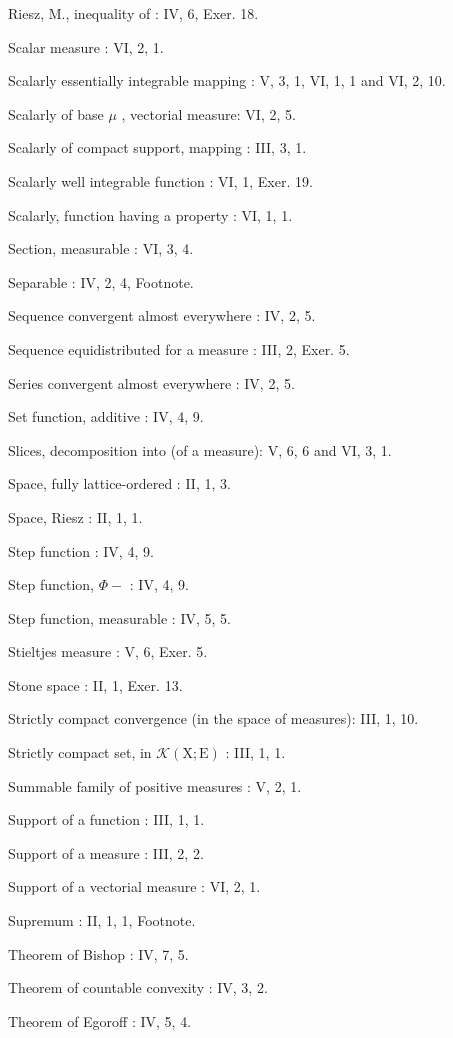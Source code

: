Riesz, M., inequality of : IV, 6, Exer. 18.

Scalar measure : VI, 2, 1.

Scalarly essentially integrable mapping : V, 3, 1, VI, 1, 1 and VI, 2, 10.

Scalarly of base \(\mu\) , vectorial measure: VI, 2, 5.

Scalarly of compact support, mapping : III, 3, 1.

Scalarly well integrable function : VI, 1, Exer. 19.

Scalarly, function having a property : VI, 1, 1.

Section, measurable : VI, 3, 4.

Separable : IV, 2, 4, Footnote.

Sequence convergent almost everywhere : IV, 2, 5.

Sequence equidistributed for a measure : III, 2, Exer. 5.

Series convergent almost everywhere : IV, 2, 5.

Set function, additive : IV, 4, 9.

Slices, decomposition into (of a measure): V, 6, 6 and VI, 3, 1.

Space, fully lattice-ordered : II, 1, 3.

Space, Riesz : II, 1, 1.

Step function : IV, 4, 9.

Step function, \(\Phi-\) : IV, 4, 9.

Step function, measurable : IV, 5, 5.

Stieltjes measure : V, 6, Exer. 5.

Stone space : II, 1, Exer. 13.

Strictly compact convergence (in the space of measures): III, 1, 10.

Strictly compact set, in \(\mathcal{K}(\mathrm{X};\mathrm{E})\) : III, 1, 1.

Summable family of positive measures : V, 2, 1.

Support of a function : III, 1, 1.

Support of a measure : III, 2, 2.

Support of a vectorial measure : VI, 2, 1.

Supremum : II, 1, 1, Footnote.

Theorem of Bishop : IV, 7, 5.

Theorem of countable convexity : IV, 3, 2.

Theorem of Egoroff : IV, 5, 4.

